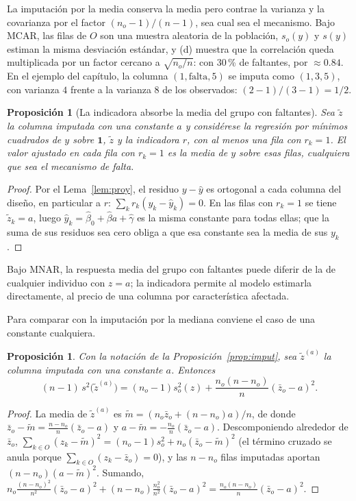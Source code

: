 \documentclass[11pt,a4paper]{article}
\theoremstyle{plain}
\newtheorem{proposicion}[teorema]{Proposición}
\theoremstyle{definition}
\theoremstyle{remark}
\newcommand{\1}{\mathbf{1}}
\begin{document}
La imputación por la media conserva la media pero contrae la varianza y la
covarianza por el factor $(n_o-1)/(n-1)$, sea cual sea el mecanismo. Bajo
MCAR, las filas de $O$ son una muestra aleatoria de la población, $s_o(y)$
y $s(y)$ estiman la misma desviación estándar, y (d) muestra que la
correlación queda multiplicada por un factor cercano a
$\sqrt{n_o/n}$: con 30\,\% de faltantes, por $\approx0.84$. En el ejemplo
del capítulo, la columna $(1,\text{falta},5)$ se imputa como $(1,3,5)$, con
varianza $4$ frente a la varianza $8$ de los observados:
$(2-1)/(3-1)=1/2$.

\begin{proposicion}[La indicadora absorbe la media del grupo con faltantes]\label{prop:indic}
Sea $\tilde z$ la columna imputada con una constante $a$ y considérese la
regresión por mínimos cuadrados de $y$ sobre $\1$, $\tilde z$ y la
indicadora $r$, con al menos una fila con $r_k=1$. El valor ajustado en
cada fila con $r_k=1$ es la media de $y$ sobre esas filas, cualquiera que
sea el mecanismo de falta.
\end{proposicion}

\begin{proof}
Por el Lema~\ref{lem:proy}, el residuo $y-\hat y$ es ortogonal a cada
columna del diseño, en particular a $r$: $\sum_kr_k(y_k-\hat y_k)=0$. En
las filas con $r_k=1$ se tiene $\tilde z_k=a$, luego
$\hat y_k=\hat\beta_0+\hat\beta a+\hat\gamma$ es la misma constante para
todas ellas; que la suma de sus residuos sea cero obliga a que esa
constante sea la media de sus $y_k$.
\end{proof}

Bajo MNAR, la respuesta media del grupo con faltantes puede diferir de la
de cualquier individuo con $z=a$; la indicadora permite al modelo estimarla
directamente, al precio de una columna por característica afectada.

Para comparar con la imputación por la mediana conviene el caso de una
constante cualquiera.

\begin{proposicion}\label{prop:imput-a}
Con la notación de la Proposición~\ref{prop:imput}, sea $\tilde z^{(a)}$ la
columna imputada con una constante $a$. Entonces
\[
(n-1)\,s^2\bigl(\tilde z^{(a)}\bigr)=(n_o-1)s_o^2(z)+\frac{n_o(n-n_o)}{n}(\bar z_o-a)^2 .
\]
\end{proposicion}

\begin{proof}
La media de $\tilde z^{(a)}$ es $\tilde m=(n_o\bar z_o+(n-n_o)a)/n$, de
donde $\bar z_o-\tilde m=\frac{n-n_o}n(\bar z_o-a)$ y
$a-\tilde m=-\frac{n_o}n(\bar z_o-a)$. Descomponiendo alrededor de $\bar
z_o$, $\sum_{k\in O}(z_k-\tilde m)^2=(n_o-1)s_o^2+n_o(\bar z_o-\tilde
m)^2$ (el término cruzado se anula porque $\sum_{k\in O}(z_k-\bar
z_o)=0$), y las $n-n_o$ filas imputadas aportan $(n-n_o)(a-\tilde m)^2$.
Sumando,
$n_o\frac{(n-n_o)^2}{n^2}(\bar z_o-a)^2+(n-n_o)\frac{n_o^2}{n^2}(\bar
z_o-a)^2=\frac{n_o(n-n_o)}{n}(\bar z_o-a)^2$.
\end{proof}
\end{document}
